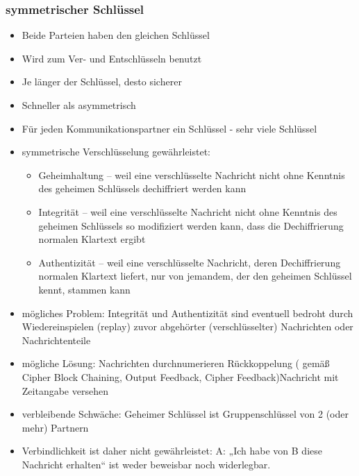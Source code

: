 \documentclass[12pt,a4paper]{article}
\begin{document}
\subsubsection{symmetrischer Schlüssel}
\begin{itemize}
    \item Beide Parteien haben den gleichen Schlüssel
	\item Wird zum Ver- und Entschlüsseln benutzt
	\item Je länger der Schlüssel, desto sicherer
	\item Schneller als asymmetrisch
	\item Für jeden Kommunikationspartner ein Schlüssel - sehr viele Schlüssel
	\item symmetrische Verschlüsselung gewährleistet:
	\begin{itemize}
	    \item Geheimhaltung – weil eine verschlüsselte Nachricht nicht ohne Kenntnis des geheimen Schlüssels dechiffriert werden kann
	    \item Integrität – weil eine verschlüsselte Nachricht nicht ohne Kenntnis des geheimen Schlüssels so modifiziert werden kann, dass die Dechiffrierung normalen Klartext ergibt
	    \item Authentizität – weil eine verschlüsselte Nachricht, deren Dechiffrierung normalen Klartext liefert, nur von jemandem, der den geheimen Schlüssel kennt, stammen kann
	\end{itemize}
	\item mögliches Problem: Integrität und Authentizität sind eventuell bedroht durch Wiedereinspielen (replay) zuvor abgehörter (verschlüsselter) Nachrichten oder Nachrichtenteile
	\item mögliche Lösung: Nachrichten durchnumerieren Rückkoppelung ( gemäß Cipher Block Chaining, Output Feedback, Cipher Feedback)Nachricht mit Zeitangabe versehen
	\item verbleibende Schwäche: Geheimer Schlüssel ist Gruppenschlüssel von 2 (oder mehr) Partnern
	\item Verbindlichkeit ist daher nicht gewährleistet: A: „Ich habe von B diese Nachricht erhalten“
ist weder beweisbar noch widerlegbar.
\end{itemize}
\end{document}
